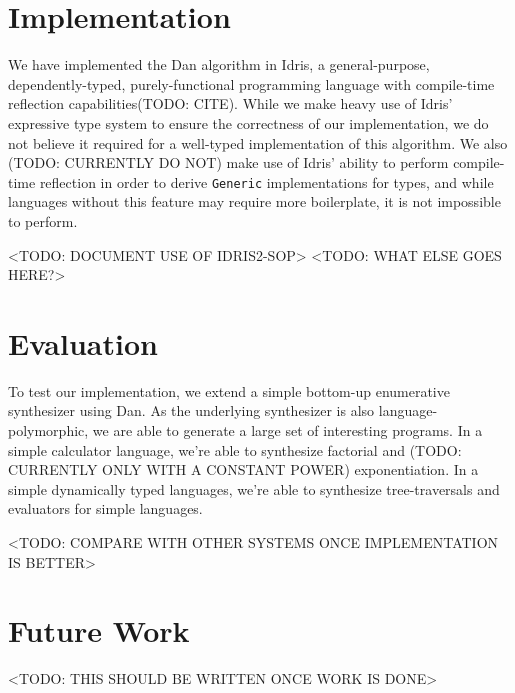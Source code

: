 \documentclass[acmsmall]{acmart}
\begin{document}
\section{Implementation}

We have implemented the Dan algorithm in Idris, a general-purpose, dependently-typed, purely-functional programming language with compile-time reflection capabilities(TODO: CITE). While we make heavy use of Idris' expressive type system to ensure the correctness of our implementation, we do not believe it required for a well-typed implementation of this algorithm. We also (TODO: CURRENTLY DO NOT) make use of Idris' ability to perform compile-time reflection in order to derive \texttt{Generic} implementations for types, and while languages without this feature may require more boilerplate, it is not impossible to perform.

<TODO: DOCUMENT USE OF IDRIS2-SOP>
<TODO: WHAT ELSE GOES HERE?>

\section{Evaluation}

To test our implementation, we extend a simple bottom-up enumerative synthesizer using Dan. As the underlying synthesizer is also language-polymorphic, we are able to generate a large set of interesting programs. In a simple calculator language, we're able to synthesize factorial and (TODO: CURRENTLY ONLY WITH A CONSTANT POWER) exponentiation. In a simple dynamically typed languages, we're able to synthesize tree-traversals and evaluators for simple languages. 

<TODO: COMPARE WITH OTHER SYSTEMS ONCE IMPLEMENTATION IS BETTER>

\section{Future Work}

<TODO: THIS SHOULD BE WRITTEN ONCE WORK IS DONE>

\end{document}
